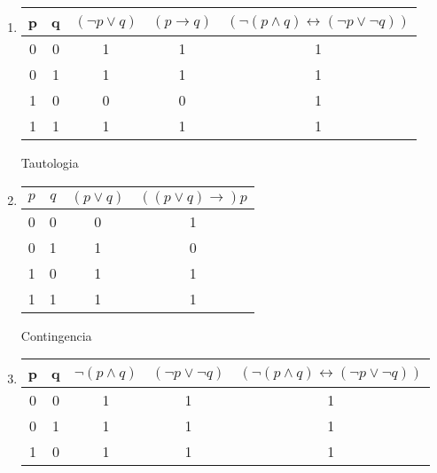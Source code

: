 \documentclass[a4paper]{article}
\begin{document}
\begin{enumerate}[label=\alph*)]
\item
\begin{tabular}{|c|c|c|c|c|}
\hline 
p & q & $(\neg p \vee q)$ & $(p\rightarrow q)$ & $(\neg(p\wedge q)\leftrightarrow (\neg p \vee \neg q))$ \\ 
\hline 
0 & 0 & 1 & 1 & 1 \\ 
\hline 
0 & 1 & 1 & 1 & 1 \\ 
\hline 
1 & 0 & 0 & 0 & 1 \\ 
\hline 
1 & 1 & 1 & 1 & 1 \\ 
\hline 
\end{tabular} 
Tautologia
\item
\begin{tabular}{|c|c|c|c|}
\hline 
$p$ & $q$ & $(p\vee q)$ & $((p \vee q)\rightarrow) p$ \\ 
\hline 
0 & 0 & 0 & 1 \\ 
\hline 
0 & 1 & 1 & 0 \\ 
\hline 
1 & 0 & 1 & 1 \\ 
\hline 
1 & 1 & 1 & 1 \\ 
\hline 
\end{tabular} 
Contingencia
\item
\begin{tabular}{|c|c|c|c|c|}
\hline 
p & q & $\neg (p\wedge q)$ & $(\neg p \vee \neg q)$ & $(\neg (p\wedge q)\leftrightarrow (\neg p \vee \neg q))$ \\ 
\hline 
0 & 0 & 1 & 1 & 1 \\ 
\hline 
0 & 1 & 1 & 1 & 1 \\ 
\hline 
1 & 0 & 1 & 1 & 1 \\ 

\end{tabular}
\end{enumerate}
\end{document}

